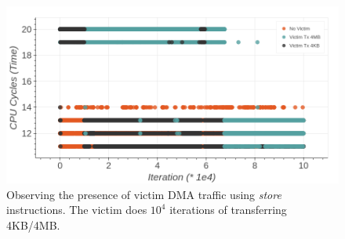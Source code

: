 \begin{figure}[!htb]
    \centering
    \includegraphics[width=0.8\columnwidth]{figures/interconnect-sc/store-ops/cpu_store_victim_observation.png}
    \caption{Observing the presence of victim DMA traffic using \textit{store} instructions. The victim does $10^4$ iterations of transferring 4KB/4MB.}
    \label{fig:cpu-store-victim-observation}
\end{figure}
